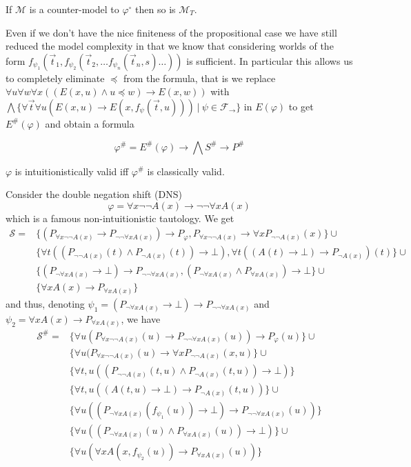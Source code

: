 \documentclass[a4paper,UKenglish,cleveref, autoref, thm-restate]{lipics-v2021}
\begin{document}
\begin{corollary}
	If $\mathcal M$ is a counter-model to $\varphi^\circ$ then so is $\mathcal M_T$.
\end{corollary}

Even if we don't have the nice finiteness of the propositional case we have still reduced the model complexity in that we know that considering worlds of the form $f_{\psi_1}(\vec t_1, f_{\psi_2}(\vec t_2, \dots f_{\psi_n}(\vec t_n, s)\dots))$ is sufficient. In particular this allows us to completely eliminate $\preceq$ from the formula, that is we replace $\forall u\forall w\forall x((E(x, u)\wedge u\preceq w)\to E(x, w))$ with $\bigwedge\{\forall \vec t\forall u(E(x, u)\to E(x, f_\psi(\vec t, u)))\:|\:\psi\in\mathcal F_\to\}$ in $E(\varphi)$ to get $E^\#(\varphi)$ and obtain a formula

$$\varphi^{\#} = E^\#(\varphi)\to \bigwedge S^\#\to P^\#$$

\begin{theorem}
	$\varphi$ is intuitionistically valid iff $\varphi^\#$ is classically valid.
\end{theorem}

\begin{example}
	Consider the double negation shift (DNS)
	$$\varphi = \forall x\neg\neg A(x)\to \neg\neg\forall x A(x)$$
	which is a famous non-intuitionistic tautology. We get
	\begin{align*}
		\mathcal S = & \{(P_{\forall x\neg\neg A(x)}\to P_{\neg\neg\forall xA(x)})\to P_\varphi, P_{\forall x\neg\neg A(x)}\to \forall xP_{\neg\neg A(x)}(x)\}\cup\\
		& \{\forall t((P_{\neg\neg A(x)}(t)\wedge P_{\neg A(x)}(t))\to \bot), \forall t((A(t)\to \bot)\to P_{\neg A(x)})(t)\}\cup\\
		& \{(P_{\neg\forall xA(x)}\to \bot)\to P_{\neg\neg\forall xA(x)}, (P_{\neg\forall xA(x)}\wedge P_{\forall xA(x)})\to \bot\}\cup\\
		&\{\forall xA(x)\to P_{\forall xA(x)}\}
	\end{align*}
	and thus, denoting $\psi_1 = (P_{\neg\forall xA(x)}\to \bot)\to P_{\neg\neg\forall xA(x)}$ and $\psi_2 = \forall xA(x)\to P_{\forall xA(x)}$, we have
	\begin{align*}
		\mathcal S^\# = & \{\forall u(P_{\forall x\neg\neg A(x)}(u)\to P_{\neg\neg\forall xA(x)}(u))\to P_\varphi(u)\}\cup\\& \{\forall u(P_{\forall x\neg\neg A(x)}(u)\to \forall xP_{\neg\neg A(x)}(x, u)\}\cup\\
		& \{\forall t, u((P_{\neg\neg A(x)}(t, u)\wedge P_{\neg A(x)}(t, u))\to \bot)\}\\& \{\forall t, u((A(t, u)\to \bot)\to P_{\neg A(x)}(t, u))\}\cup\\
		& \{\forall u((P_{\neg\forall xA(x)}(f_{\psi_1}(u))\to \bot)\to P_{\neg\neg\forall xA(x)}(u))\}\\& \{\forall u((P_{\neg\forall xA(x)}(u)\wedge P_{\forall xA(x)}(u))\to \bot)\}\cup\\
		&\{\forall u(\forall xA(x, f_{\psi_2}(u))\to P_{\forall xA(x)}(u))\}
	\end{align*}
\end{example}
\end{document}
